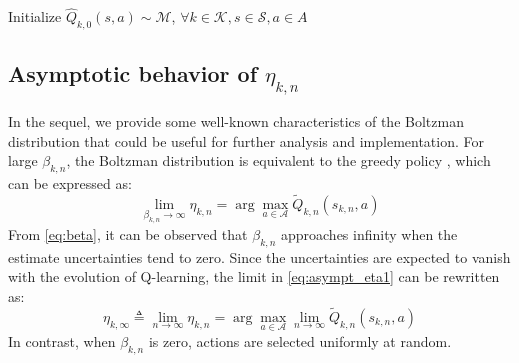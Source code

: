 \documentclass[lettersize,journal]{IEEEtran}
\begin{document}
\begin{algorithm}
\SetAlgoLined
{\small
Initialize $\widehat{Q}_{k,0}(s,a)\sim \mathcal{M}$, $\forall k \in \mathcal{K}, s\in \mathcal{S}, a \in {A}$\;
 \caption{Multi-agent $Q$-learning with cooperative exploration for discrete state spaces (GEA).}
 }
 \label{Algorithm1}
\end{algorithm}

\subsection{ Asymptotic behavior of $\eta_{k,n}$}
In the sequel, we provide some well-known characteristics of the Boltzman distribution that could be useful for further analysis and implementation. For large $\beta_{k,n}$, the Boltzman distribution is equivalent to the greedy policy \cite{SARSA}, which can be expressed as:
\begin{equation}
\label{eq:asympt_eta1}
    \lim\limits_{\beta_{k,n}\to\infty}\eta_{k,n}=\arg\max\limits_{a\in \mathcal{A}} \widetilde{Q}_{k,n}(s_{k,n},a)
\end{equation}
 From \eqref{eq:beta}, it can be observed that $\beta_{k,n}$  approaches infinity when the estimate uncertainties tend to zero. Since the uncertainties are expected to vanish with the evolution of Q-learning, the limit in \eqref{eq:asympt_eta1} can be rewritten as:   
\begin{equation}
   \label{eq:asympt_eta2} \eta_{k,\infty}\triangleq\lim\limits_{n\to\infty}\eta_{k,n}=\arg\max\limits_{a\in \mathcal{A}} \lim\limits_{n\to\infty}\widetilde{Q}_{k,n}(s_{k,n},a)
\end{equation}
In contrast, when $\beta_{k,n}$ is zero, actions are selected  uniformly at random.
\end{document}
